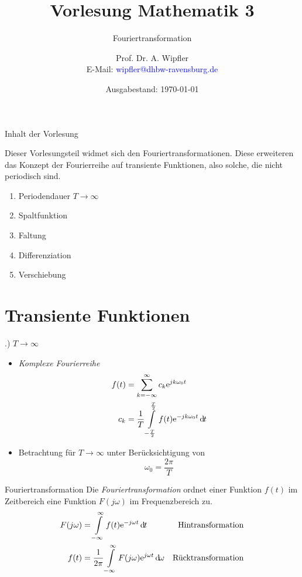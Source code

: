 \documentclass[t,14pt]{beamer}
\title[]{Vorlesung Mathematik 3}
\subtitle{Fouriertransformation}
\author[]{Prof. Dr. A. Wipfler\\ E-Mail: \textcolor{blue}{wipfler@dhbw-ravensburg.de}}
\institute[]{{\footnotesize Duale Hochschule Baden-W\"urttemberg, Ravensburg/Friedrichshafen}}
\date[]{Ausgabestand: \today}
\newcommand*\diff{\mathop{}\!\mathrm{d\hspace{-1pt}}}	%
\newcommand*\euler{\mathrm{e}} %
\begin{document}
\begin{frame}
\titlepage
\end{frame}





\begin{frame}{Inhalt der Vorlesung}


Dieser Vorlesungsteil widmet sich den Fouriertransformationen. Diese erweiteren das Konzept der Fourierreihe
auf transiente Funktionen, also solche, die nicht periodisch sind.
\begin{enumerate}
\item Periodendauer $T\to\infty$
\item Spaltfunktion
\item Faltung
\item Differenziation
\item Verschiebung
\end{enumerate}

\end{frame}

\section{Transiente Funktionen}
\begin{frame}{\thesection .) $T\to\infty$}
\begin{itemize}
    \item \emph{Komplexe Fourierreihe}
    \begin{align*}
        f(t)    &= \suml_{k=-\infty}^{\infty}c_k\euler^{jk\omega_0t}\\
        c_k     &= \frac{1}{T}\intl_{-\frac{T}{2}}^{\frac{T}{2}}f(t)\euler^{-jk\omega_0t}\diff t
    \end{align*} 
    \item Betrachtung für $T\to\infty$ unter Berücksichtigung von 
    \[
    \omega_0 = \frac{2\pi}{T}
    \]
    \begin{center}
    \end{center}
\end{itemize}
\begin{alertblock}{Fouriertransformation}
    Die \emph{Fouriertransformation} ordnet einer Funktion $f(t)$ im Zeitbereich eine Funktion $F(j\omega)$ im 
    Frequenzbereich zu.
    \begin{align*}
        F(j\omega)  &= \intl_{-\infty}^{\infty} f(t)\euler^{-j\omega t}\diff t                          &\text{Hintransformation}\\
        f(t)        &= \frac{1}{2\pi}\intl_{-\infty}^{\infty}F(j\omega)\euler^{j\omega t}\diff\omega    &\text{Rücktransformation}
    \end{align*}
\end{alertblock}
\end{frame}
\end{document}
